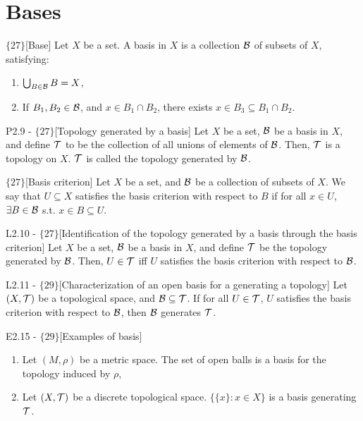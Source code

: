 \documentclass{article}
\begin{document}
\section{Bases}
\begin{flexidefinition}{$\{27\}$}[Base]
Let $X$ be a set. A basis in $X$ is a collection $\mathcal{B}$ of subsets of $X$, satisfying:
\begin{enumerate}[label = (\alph*)]
    \item $\bigcup_{B \in \mathcal{B}} B = X$,
    \item If $B_1,B_2 \in \mathcal{B}$, and $x \in B_1 \cap B_2$, there exists $x \in B_3 \subseteq B_1 \cap B_2$.
\end{enumerate}
\end{flexidefinition}

\begin{flexilemma}{P2.9 - $\{27\}$}[Topology generated by a basis]
    Let $X$ be a set, $\mathcal{B}$ be a basis in $X$, and define $\mathcal{T}$ to be the collection of all unions of elements of $\mathcal{B}$. Then, $\mathcal{T}$ is a topology on $X$. $\mathcal{T}$ is called the topology generated by $\mathcal{B}$.
\end{flexilemma}

\begin{flexidefinition}{$\{27\}$}[Basis criterion]
    Let $X$ be a set, and $\mathcal{B}$ be a collection of subsets of $X$. We say that $U \subseteq X$ satisfies the basis criterion with respect to $B$ if for all $x \in U$, $\exists B \in \mathcal{B}$ s.t. $x \in B \subseteq U$.
\end{flexidefinition}
\begin{flexilemma}{L2.10 - $\{27\}$}[Identification of the topology generated by a basis through the basis criterion]
    Let $X$ be a set, $\mathcal{B}$ be a basis in $X$, and define $\mathcal{T}$ be the topology generated by $\mathcal{B}$. Then, $U \in \mathcal{T}$ iff $U$ satisfies the basis criterion with respect to $\mathcal{B}$.
\end{flexilemma}

\begin{flexilemma}{L2.11 - $\{29\}$}[Characterization of an open basis for a generating a topology]
    Let $(X,\mathcal{T})$ be a topological space, and $\mathcal{B} \subseteq \mathcal{T}$. If for all $U \in \mathcal{T}$, $U$ satisfies the basis criterion with respect to $\mathcal{B}$, then $\mathcal{B}$ generates $\mathcal{T}$.
\end{flexilemma}

\begin{flexilemma}{E2.15 - $\{29\}$}[Examples of basis]
    \begin{enumerate}
        \item Let $(M,\rho)$ be a metric space. The set of open balls is a basis for the topology induced by $\rho$,
        \item Let $(X,\mathcal{T})$ be a discrete topological space. $\{ \{x\} : x \in X\}$ is a basis generating $\mathcal{T}$.
    \end{enumerate}
\end{flexilemma}
\end{document}
